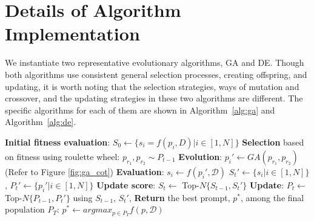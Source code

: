 \appendix
\newpage
\section{Details of Algorithm Implementation}
We instantiate \modelname two representative evolutionary algorithms, GA and DE. 
Though both algorithms use consistent general selection processes, creating offspring, and updating, it is worth noting that the selection strategies, ways of mutation and crossover, and the updating strategies in these two algorithms are different. 
The specific algorithms for each of them are shown in Algorithm~\ref{alg:ga} and Algorithm~\ref{alg:de}. 

\begin{algorithm}[t]
\caption{Discrete prompt optimization: \modelname (\textbf{GA})}  
\begin{algorithmic}[1]

\State \textbf{Initial fitness evaluation}: $S_0\leftarrow\{s_i=f(p_i, D)| i\in[1,N]\}$
       \State \textbf{Selection} based on fitness using roulette wheel: $p_{r_1}, p_{r_2} \sim P_{t-1}$ 
       \State \textbf{Evolution}: $p_i' \leftarrow GA(p_{r_1}, p_{r_2})$ (Refer to Figure \ref{fig:ga_cot})
       \State \textbf{Evaluation}: $s_i\leftarrow f(p_i', \mathcal D)$
   \EndFor  
   \State $S_{t}'\leftarrow\{s_i|i\in[1,N]\}$, $P_t'\leftarrow\{p_i'|i\in[1,N]\}$
   \State \textbf{Update score}: $S_t\leftarrow $ Top-$N\{S_{t-1}, S_{t}'\}$
   \State \textbf{Update}: $P_t\leftarrow$ Top-$N\{P_{t-1}, P_{t}'\}$ using $S_{t-1}$, $S_{t}'$, 
\EndFor
\State \textbf{Return} the best prompt, $p^*$, among the final population $P_T$: $p^*\leftarrow argmax_{p \in P_T} f(p, \mathcal D)$

\end{algorithmic}
\label{alg:ga}
\end{algorithm} 

